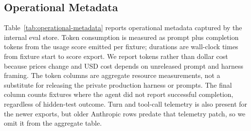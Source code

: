 \documentclass[11pt,letterpaper]{article}
\begin{document}
\subsection{Operational Metadata}

Table~\ref{tab:operational-metadata} reports operational metadata captured by the internal eval store. Token consumption is measured as prompt plus completion tokens from the usage score emitted per fixture; durations are wall-clock times from fixture start to score export. We report tokens rather than dollar cost because prices change and USD cost depends on unreleased prompt and harness framing. The token columns are aggregate resource measurements, not a substitute for releasing the private production harness or prompts. The final column counts fixtures where the agent did not report successful completion, regardless of hidden-test outcome. Turn and tool-call telemetry is also present for the newer exports, but older Anthropic rows predate that telemetry patch, so we omit it from the aggregate table.

\begin{table}[ht]
\centering
\caption{Operational metadata for the full \textsc{RefactorBench}-JS run. Token columns use prompt+completion tokens for rows where usage metadata was exported; ``Usage Rows'' reports that coverage.}
\label{tab:operational-metadata}
\small
{}
\end{table}
\end{document}
